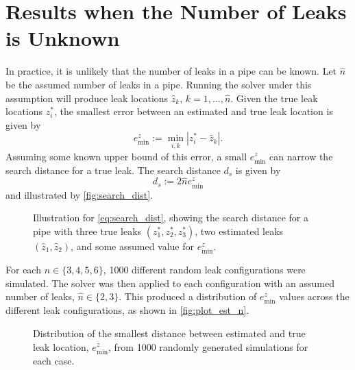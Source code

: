 \FloatBarrier
\section{Results when the Number of Leaks is Unknown}
\label{sec:n_not_known}

In practice, it is unlikely that the number of leaks in a pipe can be known. Let $\hat n$ be the assumed number of leaks in a pipe. Running the solver under this assumption will produce leak locations $\hat{z} _ k$, $ k = 1,\dots,\hat{n} $. Given the true leak locations $z^*_i$, the smallest error between an estimated and true leak location is given by
\begin{equation*}
    e^z_{\min} := \min_{i,k}|z^*_i-\hat z_k|.
\end{equation*}
Assuming some known upper bound of this error, a small $e^z_{\min}$ can narrow the search distance for a true leak. The search distance $d_s$ is given by
\begin{equation}
\label{eq:search_dist}
    d_s := 2 \hat{n} e^z_{\min}
\end{equation}
and illustrated by \autoref{fig:search_dist}.\\

\begin{figure}[ht]
    \centering
    
    \caption[Illustration of search distance]{Illustration for \cref{eq:search_dist}, showing the search distance for a pipe with three true leaks $(z^*_1,z^*_2,z^*_3)$, two estimated leaks $(\hat z_1, \hat z_2)$, and some assumed value for $e^z_{\min}$.}
    \label{fig:search_dist}
\end{figure}

\FloatBarrier

For each $n\in\{3,4,5,6\}$, 1000 different random leak configurations were simulated. The solver was then applied to each configuration with an assumed number of leaks, $\hat {n} \in \{2, 3\}$. This produced a distribution of $e^z_{\min}$ values across the different leak configurations, as shown in \autoref{fig:plot_est_n}.\\

\begin{figure}[ht]
    \centering
    
    \caption[Distribution of the smallest distance between estimated and true leak location]{Distribution of the smallest distance between estimated and true leak location, $e^z_{\min}$, from 1000 randomly generated simulations for each case.}
    \label{fig:plot_est_n}
\end{figure}

